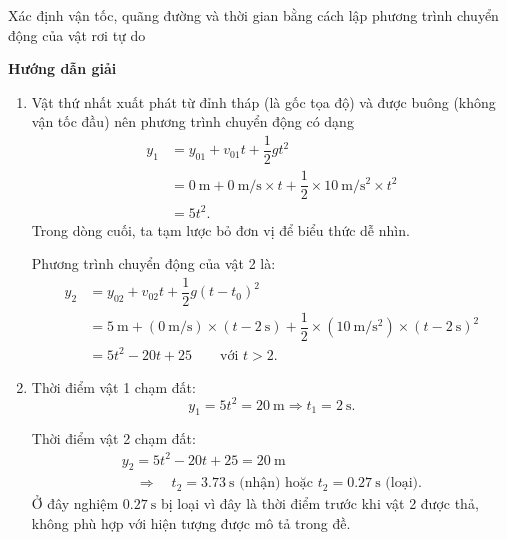 \begin{dang}{Xác định vận tốc, quãng đường và thời gian bằng cách lập phương trình chuyển động của vật rơi tự do}
	{	\begin{center}
			\textbf{Hướng dẫn giải}
		\end{center}
		
		\begin{enumerate}[label=\alph*.]
			\item 
			Vật thứ nhất xuất phát từ đỉnh tháp (là gốc tọa độ) và được buông (không vận tốc đầu) nên phương trình chuyển động có dạng 
			\begin{align*}
				y_1&=y_{01}+v_{01}t+\dfrac{1}{2}gt^2\\
					&=\SI{0}{\meter}+ \SI{0}{\meter/\second}\times t +\dfrac{1}{2}\times\SI{10}{\meter/\second^{2}}\times t^{2}\\
					&=5t^{2}.
			\end{align*}
			Trong dòng cuối, ta tạm lược bỏ đơn vị để biểu thức dễ nhìn. 
			
			Phương trình chuyển động của vật 2 là:
			\begin{align*}
				y_{2}&=y_{02}+v_{02}t+\dfrac{1}{2}g(t-t_0)^2\\
					&=\SI{5}{\meter}+(\SI{0}{\meter/\second})\times (t-\SI{2}{\second})+\dfrac{1}{2}\times(\SI{10}{\meter/\second^{2}})\times (t-\SI{2}{\second})^{2}\\
					&=5t^2-20t+25\qquad \textrm{với }t>2.
			\end{align*}
			\item 
			Thời điểm vật 1 chạm đất:
			\begin{equation*}
				y_1=5t^2=\SI{20}{\meter}\Rightarrow t_1=\SI{2}{\second}.
			\end{equation*}
			
			Thời điểm vật 2 chạm đất:
			\begin{equation*}
				\begin{gathered}
					y_{2}=5t^2-20t+25=\SI{20}{\meter}\\ \quad\Rightarrow\quad t_2=\SI{3.73}{\second}\textrm{ (nhận) hoặc } t_2=\SI{0.27}{\second}\textrm{ (loại)}.
				\end{gathered}
			\end{equation*}
			Ở đây nghiệm $\SI{0.27}{\second}$ bị loại vì đây là thời điểm trước khi vật 2 được thả, không phù hợp với hiện tượng được mô tả trong đề. 
			

\end{enumerate}}
\end{dang}
